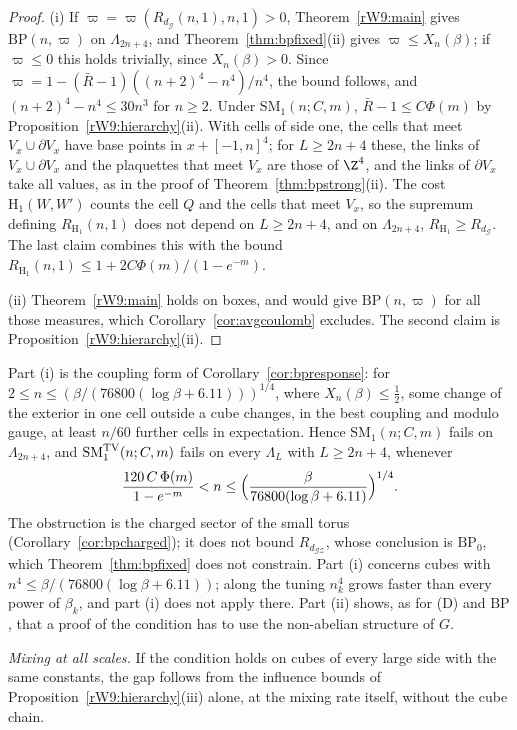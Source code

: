 \begin{proof}
(i) If $\varpi=\varpi(R_{d_{\mathcal G}}(n,1),n,1)>0$, Theorem~\ref{rW9:main}
gives $\mathrm{BP}(n,\varpi)$ on $\Lambda_{2n+4}$, and
Theorem~\ref{thm:bpfixed}(ii) gives $\varpi\le X_n(\beta)$; if $\varpi\le0$
this holds trivially, since $X_n(\beta)>0$. Since $\varpi=1-(\bar R-1)((n+2)^4-n^4)/n^4$, the
bound follows, and $(n+2)^4-n^4\le30n^3$ for $n\ge2$. Under
$\mathrm{SM}_1(n;C,m)$, $\bar R-1\le C\Phi(m)$ by
Proposition~\ref{rW9:hierarchy}(ii). With cells of side one, the cells that
meet $V_x\cup\partial V_x$ have base points in $x+[-1,n]^4$; for $L\ge2n+4$
these, the links of $V_x\cup\partial V_x$ and the plaquettes that meet $V_x$
are those of $\Z^4$, and the links of $\partial V_x$ take all values, as in
the proof of Theorem~\ref{thm:bpstrong}(ii). The cost $\mathrm H_1(W,W')$
counts the cell $Q$ and the cells that meet $V_x$, so the supremum defining
$R_{\mathrm H_1}(n,1)$ does not depend on $L\ge2n+4$, and on
$\Lambda_{2n+4}$, $R_{\mathrm H_1}\ge R_{d_{\mathcal G}}$. The last claim
combines this with the bound $R_{\mathrm H_1}(n,1)\le1+2C\Phi(m)/
(1-e^{-m})$.

(ii) Theorem~\ref{rW9:main} holds on boxes, and would give $\mathrm{BP}(n,
\varpi)$ for all those measures, which Corollary~\ref{cor:avgcoulomb}
excludes. The second claim is Proposition~\ref{rW9:hierarchy}(ii).
\end{proof}

Part (i) is the coupling form of Corollary~\ref{cor:bpresponse}: for $2\le
n\le(\beta/(76800(\log\beta+6.11)))^{1/4}$, where $X_n(\beta)\le\frac12$,
some change of the exterior in one cell outside a cube changes, in the best
coupling and modulo gauge, at least $n/60$ further cells in expectation.
Hence $\mathrm{SM}_1(n;C,m)$ fails on $\Lambda_{2n+4}$, and
$\mathrm{SM}^{\rm TV}_1(n;C,m)$ fails on every $\Lambda_L$ with $L\ge2n+4$,
whenever
\[
\frac{120\,C\,\Phi(m)}{1-e^{-m}}<n\le\Bigl(\frac\beta{76800(\log\beta+
6.11)}\Bigr)^{1/4} .
\]
The obstruction is the charged sector of the small torus
(Corollary~\ref{cor:bpcharged}); it does not bound $R_{d_{\mathcal{GZ}}}$,
whose conclusion is $\mathrm{BP}_0$, which Theorem~\ref{thm:bpfixed} does not
constrain. Part (i) concerns cubes with $n^4\le\beta/(76800(\log\beta+
6.11))$; along the tuning $n_k^4$ grows faster than every power of
$\beta_k$, and part (i) does not apply there. Part (ii) shows, as for (D)
and $\mathrm{BP}$, that a proof of the condition has to use the non-abelian
structure of $G$.

\emph{Mixing at all scales.} If the condition holds on cubes of every large
side with the same constants, the gap follows from the influence bounds of
Proposition~\ref{rW9:hierarchy}(iii) alone, at the mixing rate itself, without
the cube chain.

